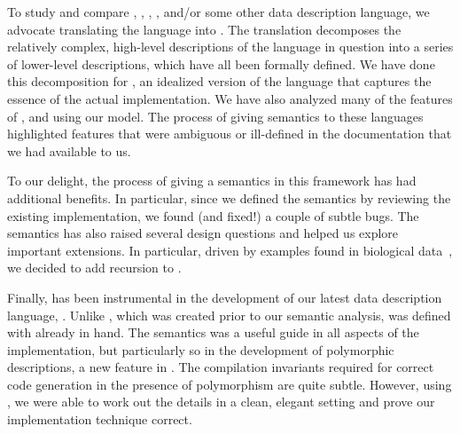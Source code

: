 To study and compare \padsc{}, \padsml{}, \packettypes{},
\datascript{}, and/or some other data description language, we
advocate translating the language into \ddc{}.  The translation
decomposes the relatively complex, high-level descriptions of the
language in question into a series of lower-level \ddc{} descriptions,
which have all been formally defined.  We have done this decomposition
for \ipads{}, an idealized version of the \padsc{} language that
captures the essence of the actual implementation.  We have also
analyzed many of the features of \padsml{}, \packettypes{} and \datascript{}
using our model.  The process of giving semantics to these languages
highlighted features that were ambiguous or ill-defined in the
documentation that we had available to us.

To our delight, the process of giving \padsc{} 
a semantics in this framework has had additional benefits.  
In particular, since we defined the
semantics by reviewing the existing 
implementation, we found (and fixed!) a couple of subtle bugs.  
The semantics has also raised several
design questions and helped us explore important extensions.
In particular, driven by examples found in biological data~\cite{geneontology,newick-data}, we decided to add recursion to \padsc{}.

Finally, \ddc{} has been instrumental in the development of our
latest data description language,
\padsml{}.  Unlike \padsc, which was created prior to our semantic analysis,
\padsml{} was defined with \ddc{} already in hand.  The semantics
was a useful guide in all aspects of the \padsml{} implementation, but
particularly so in the development of polymorphic descriptions, a new
feature in \padsml{}.  The compilation invariants required for correct
code generation in the presence of polymorphism are quite subtle.  However,
using \ddc{}, we were able to work out the details in a clean, elegant
setting and prove our implementation technique correct.

